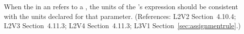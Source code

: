 When the  in an \InitialAssignment refers to a \Parameter,
the units of the \InitialAssignment's  expression should be
consistent with the units declared for that parameter.  (References: L2V2
Section~4.10.4; L2V3 Section~4.11.3; L2V4 Section~4.11.3; 
L3V1 Section~\ref{sec:assignmentrule}.)
